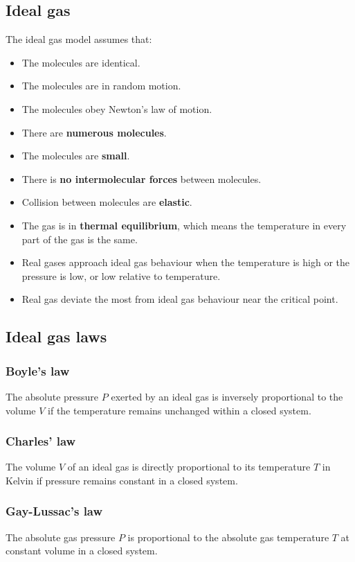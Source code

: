 \documentclass[11pt]{article}
\begin{document}
\subsection{Ideal gas}
\label{sec:org56ddf6e}
The ideal gas model assumes that:
\begin{itemize}
\item The molecules are identical.
\item The molecules are in random motion.
\item The molecules obey Newton's law of motion.
\item There are \textbf{numerous molecules}.
\item The molecules are \textbf{small}.
\item There is \textbf{no intermolecular forces} between molecules.
\item Collision between molecules are \textbf{elastic}.
\item The gas is in \textbf{thermal equilibrium}, which means the temperature in every part of the gas is the same.
\item Real gases approach ideal gas behaviour when the temperature is high or the pressure is low, or low relative to temperature.
\item Real gas deviate the most from ideal gas behaviour near the critical point.
\end{itemize}
\subsection{Ideal gas laws}
\label{sec:org9c16f03}

\subsubsection{Boyle's law}
\label{sec:org9cccb76}
The absolute pressure \(P\) exerted by an ideal gas is inversely proportional to the volume \(V\) if the temperature remains unchanged within a closed system.
\subsubsection{Charles' law}
\label{sec:orgd80c4e3}
The volume \(V\) of an ideal gas is directly proportional to its temperature \(T\) in Kelvin if pressure remains constant in a closed system.
\subsubsection{Gay-Lussac's law}
\label{sec:org047753d}
The absolute gas pressure \(P\) is proportional to the absolute gas temperature \(T\) at constant volume in a closed system.
\end{document}
